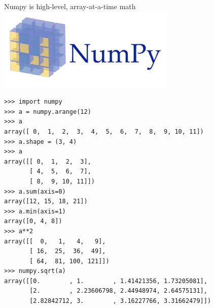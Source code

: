 \documentclass[aspectratio=169]{beamer}
\begin{document}
\begin{frame}[fragile]{Numpy is high-level, array-at-a-time math}
\vspace{0.5 cm}
\hfill \includegraphics[height=1.5 cm]{numpy-logo.png}

\scriptsize
\vspace{-1.6 cm}
\begin{verbatim}
>>> import numpy
>>> a = numpy.arange(12)
>>> a
array([ 0,  1,  2,  3,  4,  5,  6,  7,  8,  9, 10, 11])
>>> a.shape = (3, 4)
>>> a
array([[ 0,  1,  2,  3],
       [ 4,  5,  6,  7],
       [ 8,  9, 10, 11]])
>>> a.sum(axis=0)
array([12, 15, 18, 21])
>>> a.min(axis=1)
array([0, 4, 8])
>>> a**2
array([[  0,   1,   4,   9],
       [ 16,  25,  36,  49],
       [ 64,  81, 100, 121]])
>>> numpy.sqrt(a)
array([[0.        , 1.        , 1.41421356, 1.73205081],
       [2.        , 2.23606798, 2.44948974, 2.64575131],
       [2.82842712, 3.        , 3.16227766, 3.31662479]])
\end{verbatim}
\end{frame}
\end{document}
